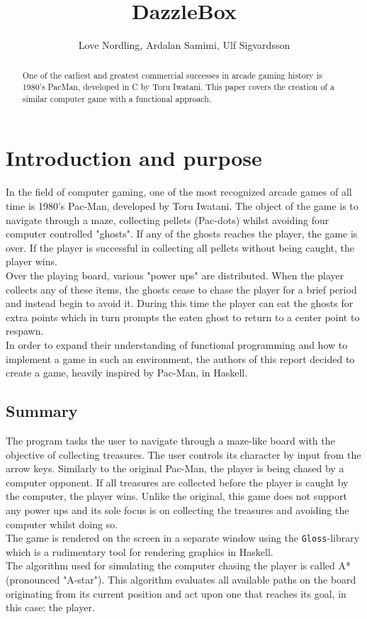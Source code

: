 \documentclass{article}
\begin{document}
\title{DazzleBox}
\author{Love Nordling, Ardalan Samimi, Ulf Sigvardsson}
\maketitle
\begin{abstract}
One of the earliest and greatest commercial successes in arcade gaming history is 1980's PacMan, developed in C by Toru Iwatani. This paper covers the creation of a similar computer game with a functional approach.
\end{abstract}
\newpage
\tableofcontents
\newpage

\section{Introduction and purpose}
In the field of computer gaming, one of the most recognized arcade games of all time is 1980's Pac-Man, developed by Toru Iwatani. The object of the game is to navigate through a maze, collecting pellets (Pac-dots) whilst avoiding four computer controlled "ghosts". If any of the ghosts reaches the player, the game is over. If the player is successful in collecting all pellets without being caught, the player wins. \\
		\newline
Over the playing board, various "power ups" are distributed. When the player collects any of these items, the ghosts cease to chase the player for a brief period and instead begin to avoid it. During this time the player can eat the ghosts for extra points which in turn prompts the eaten ghost to return to a center point to respawn.\\
		\newline
In order to expand their understanding of functional programming and how to implement a game in such an environment, the authors of this report decided to create a game, heavily inspired by Pac-Man, in Haskell.

	\subsection{Summary}
	The program tasks the user to navigate through a maze-like board with the objective of collecting treasures. The user controls its character by input from the arrow keys. Similarly to the original Pac-Man, the player is being chased by a computer opponent. If all treasures are collected before the player is caught by the computer, the player wins. Unlike the original, this game does not support any power ups and its sole focus is on collecting the treasures and avoiding the computer whilst doing so.\\
		\newline
	The game is rendered on the screen in a separate window using the \texttt{Gloss}-library which is a rudimentary tool for rendering graphics in Haskell.\\
		\newline
	The algorithm used for simulating the computer chasing the player is called A* (pronounced "A-star"). This algorithm evaluates all available paths on the board 	 originating from its current position and act upon one that reaches its goal, in this case: the player.
		\newpage
\end{document}
